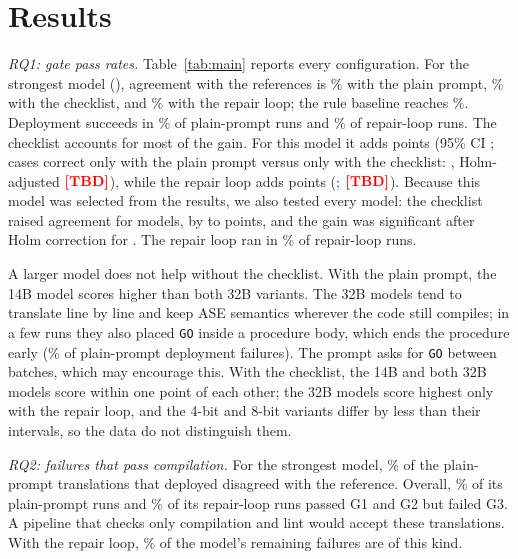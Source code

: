 \section{Results}\label{sec:results}


\textit{RQ1: gate pass rates.} Table~\ref{tab:main} reports every configuration. For the strongest model
(\BestModel), agreement with the references is \PlainEquiv\% with the plain prompt, \TrapEquiv\% with the
checklist, and \AgenticEquiv\% with the repair loop; the rule baseline reaches \RulesEquiv\%. Deployment
succeeds in \PlainGOne\% of plain-prompt runs and \AgenticGOne\% of repair-loop runs. The checklist accounts
for most of the gain. For this model it adds \CheckEffect{} points (95\% CI \CheckEffectCI; cases correct
only with the plain prompt versus only with the checklist: \PlainTrapDisc, Holm-adjusted $\textcolor{red}{\textbf{[TBD]}}$),
while the repair loop adds \RepairEffect{} points (\RepairEffectCI; $\textcolor{red}{\textbf{[TBD]}}$). Because this model was
selected from the results, we also tested every model: the checklist raised agreement for
\CheckPositiveModels{} models, by \CheckEffectMin{} to \CheckEffectMax{} points, and the gain was significant
after Holm correction for \CheckSigModels. The repair loop ran in \RepairShare\% of repair-loop runs.

A larger model does not help without the checklist. With the plain prompt, the 14B model scores higher than
both 32B variants. The 32B models tend to translate line by line and keep ASE semantics wherever the code
still compiles; in a few runs they also placed \texttt{GO} inside a procedure body, which ends the
procedure early (\GoSplitShare\% of plain-prompt deployment failures). The prompt asks for \texttt{GO}
between batches, which may encourage this. With the checklist, the 14B and both 32B models score within one point of each other; the 32B models
score highest only with the repair loop, and the 4-bit and 8-bit variants differ by less than their
intervals, so the data do not distinguish them.

\textit{RQ2: failures that pass compilation.} For the strongest model, \PlainSilentGivenCompile\% of the
plain-prompt translations that deployed disagreed with the reference. Overall, \PlainSilent\% of its
plain-prompt runs and \AgenticSilent\% of its repair-loop runs passed G1 and G2 but failed G3. A pipeline
that checks only compilation and lint would accept these translations. With the repair loop,
\BestAgentSilentShare\% of the model's remaining failures are of this kind.

